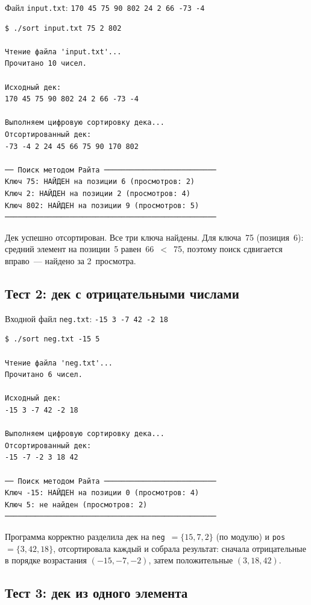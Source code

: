 \documentclass[a4paper,14pt]{extarticle}
\begin{document}
Файл \texttt{input.txt}: \texttt{170 45 75 90 802 24 2 66 -73 -4}

\begin{Verbatim}[frame=single,fontsize=\footnotesize]
$ ./sort input.txt 75 2 802

Чтение файла 'input.txt'...
Прочитано 10 чисел.

Исходный дек:
170 45 75 90 802 24 2 66 -73 -4

Выполняем цифровую сортировку дека...
Отсортированный дек:
-73 -4 2 24 45 66 75 90 170 802

── Поиск методом Райта ──────────────────────────
Ключ 75: НАЙДЕН на позиции 6 (просмотров: 2)
Ключ 2: НАЙДЕН на позиции 2 (просмотров: 4)
Ключ 802: НАЙДЕН на позиции 9 (просмотров: 5)
─────────────────────────────────────────────────
\end{Verbatim}

Дек успешно отсортирован. Все три ключа найдены. Для ключа~75 (позиция~6): средний элемент на позиции~5 равен~66~$<$~75, поэтому поиск сдвигается вправо~--- найдено за 2~просмотра.

\subsection{Тест 2: дек с отрицательными числами}

Входной файл \texttt{neg.txt}: \texttt{-15 3 -7 42 -2 18}

\begin{Verbatim}[frame=single,fontsize=\footnotesize]
$ ./sort neg.txt -15 5

Чтение файла 'neg.txt'...
Прочитано 6 чисел.

Исходный дек:
-15 3 -7 42 -2 18

Выполняем цифровую сортировку дека...
Отсортированный дек:
-15 -7 -2 3 18 42

── Поиск методом Райта ──────────────────────────
Ключ -15: НАЙДЕН на позиции 0 (просмотров: 4)
Ключ 5: не найден (просмотров: 2)
─────────────────────────────────────────────────
\end{Verbatim}

Программа корректно разделила дек на \texttt{neg}~$=\{15, 7, 2\}$ (по модулю) и \texttt{pos}~$=\{3, 42, 18\}$, отсортировала каждый и собрала результат: сначала отрицательные в порядке возрастания $(-15, -7, -2)$, затем положительные $(3, 18, 42)$.

\subsection{Тест 3: дек из одного элемента}
\end{document}
